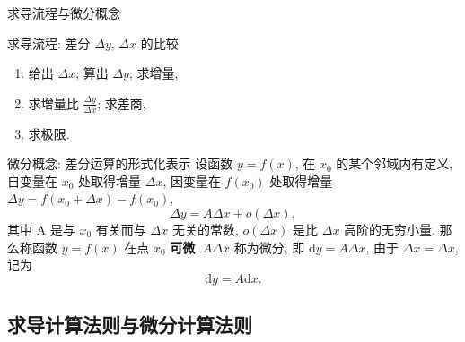 \documentclass[
10pt,
aspectratio=43,
]{beamer}
\begin{document}
\begin{frame}{求导流程与微分概念}
	\begin{block}{求导流程: 差分 $\Delta y$, $\Delta x$ 的比较}
		\begin{enumerate}
			\item 	给出 $\Delta x$; 算出 $\Delta y$; 求增量,
			\item  	求增量比 $\frac{\Delta y}{\Delta x}$; 求差商,
			\item  	求极限.
		\end{enumerate}
	\end{block}

	\begin{block}{微分概念: 差分运算的形式化表示}
		设函数 $y=f(x)$, 在 $x_0$ 的某个邻域内有定义, 自变量在 $x_0$ 处取得增量 $\Delta x$, 因变量在 $f(x_0)$ 处取得增量 $\Delta y=f\left(x_0+\Delta x\right)-f\left(x_0\right)$,
		$$
			\Delta y=A \Delta x+o(\Delta x),
		$$
		其中 $\mathrm{A}$ 是与 $x_0$ 有关而与 $\Delta x$ 无关的常数, $o(\Delta x)$ 是比 $\Delta x$ 高阶的无穷小量. 那么称函数 $y=f(x)$ 在点 $x_0$ {\bf 可微}, $A \Delta x$ 称为微分, 即 $\mathrm{d} y=A \Delta x$, 由于 $\Delta x = \Delta x$, 记为
		$$
			\mathrm{d}y = A \mathrm{d}x.
		$$
	\end{block}
\end{frame}

\subsection{求导计算法则与微分计算法则}
\end{document}
